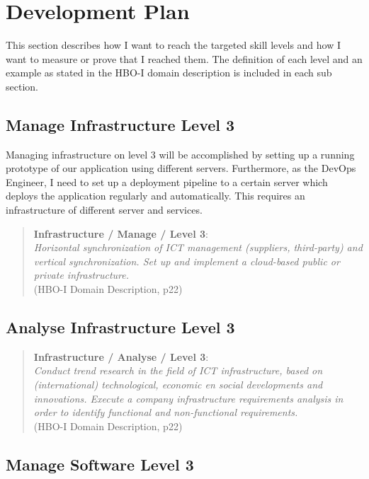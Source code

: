 
\section{Development Plan}
\label{sec:development}

This section describes how I want to reach the targeted skill levels and how I want to measure or prove that I reached them.
The definition of each level and an example as stated in the HBO-I domain description is included in each sub section.

\subsection{Manage Infrastructure Level 3}

Managing infrastructure on level 3 will be accomplished by setting up a running prototype of our application using different servers.
Furthermore, as the DevOps Engineer, I need to set up a deployment pipeline to a certain server which deploys the application regularly and automatically. This requires an infrastructure of different server and services.

\begin{quote}
	\textbf{Infrastructure / Manage / Level 3}: \\
	\textit{
		Horizontal synchronization of ICT management (suppliers, third-party) and vertical synchronization.
		Set up and implement a cloud-based public or private infrastructure.
	} \\ (HBO-I Domain Description, p22)
\end{quote}


\subsection{Analyse Infrastructure Level 3}


\begin{quote}
	\textbf{Infrastructure / Analyse / Level 3}: \\
	\textit{
		Conduct trend research in the field of ICT infrastructure, based on (international) technological, economic en social developments and innovations. Execute a company infrastructure requirements analysis in order to identify functional and non-functional requirements.
	} \\ (HBO-I Domain Description, p22)
\end{quote}

\subsection{Manage Software Level 3}

